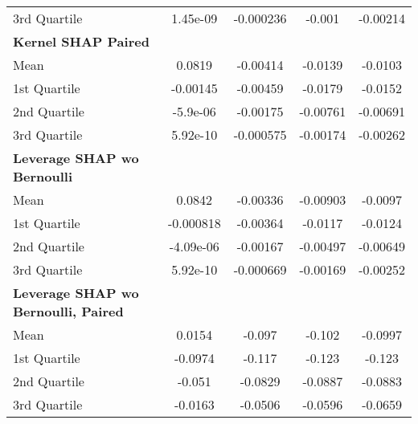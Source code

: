 {\begin{tabular} {lcccc}
\hspace{7pt}3rd Quartile & 1.45e-09 & -0.000236 & -0.001 & -0.00214 \\ 
\addlinespace[1ex] 
\textbf{Kernel SHAP Paired} &  &  &  &  \\ 
\hspace{7pt}Mean & \cellcolor{bronze!60}0.0819 & -0.00414 & -0.0139 & -0.0103 \\ 
\hspace{7pt}1st Quartile & \cellcolor{bronze!60}-0.00145 & -0.00459 & -0.0179 & -0.0152 \\ 
\hspace{7pt}2nd Quartile & \cellcolor{bronze!60}-5.9e-06 & -0.00175 & -0.00761 & -0.00691 \\ 
\hspace{7pt}3rd Quartile & \cellcolor{bronze!60}5.92e-10 & -0.000575 & -0.00174 & -0.00262 \\ 
\addlinespace[1ex] 
\textbf{Leverage SHAP wo Bernoulli} &  &  &  &  \\ 
\hspace{7pt}Mean & 0.0842 & -0.00336 & -0.00903 & -0.0097 \\ 
\hspace{7pt}1st Quartile & -0.000818 & -0.00364 & -0.0117 & -0.0124 \\ 
\hspace{7pt}2nd Quartile & -4.09e-06 & -0.00167 & -0.00497 & -0.00649 \\ 
\hspace{7pt}3rd Quartile & \cellcolor{bronze!60}5.92e-10 & -0.000669 & -0.00169 & -0.00252 \\ 
\addlinespace[1ex] 
\textbf{Leverage SHAP wo Bernoulli, Paired} &  &  &  &  \\ 
\hspace{7pt}Mean & \cellcolor{silver!60}0.0154 & \cellcolor{silver!60}-0.097 & \cellcolor{silver!60}-0.102 & \cellcolor{silver!60}-0.0997 \\ 
\hspace{7pt}1st Quartile & \cellcolor{silver!60}-0.0974 & \cellcolor{silver!60}-0.117 & \cellcolor{silver!60}-0.123 & \cellcolor{silver!60}-0.123 \\ 
\hspace{7pt}2nd Quartile & \cellcolor{silver!60}-0.051 & \cellcolor{silver!60}-0.0829 & \cellcolor{silver!60}-0.0887 & \cellcolor{silver!60}-0.0883 \\ 
\hspace{7pt}3rd Quartile & \cellcolor{silver!60}-0.0163 & \cellcolor{silver!60}-0.0506 & \cellcolor{silver!60}-0.0596 & \cellcolor{silver!60}-0.0659 \\ 
\bottomrule
\end{tabular}}